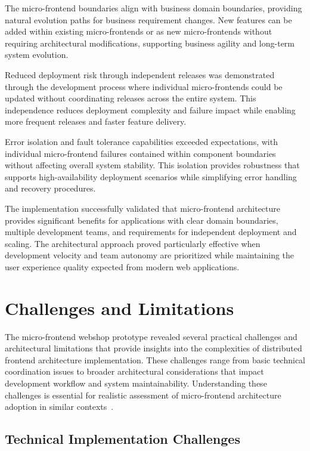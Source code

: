 \documentclass[12pt,a4paper]{report}
\begin{document}
The micro-frontend boundaries align with business domain boundaries, providing natural evolution paths for business requirement changes. New features can be added within existing micro-frontends or as new micro-frontends without requiring architectural modifications, supporting business agility and long-term system evolution.

Reduced deployment risk through independent releases was demonstrated through the development process where individual micro-frontends could be updated without coordinating releases across the entire system. This independence reduces deployment complexity and failure impact while enabling more frequent releases and faster feature delivery.

Error isolation and fault tolerance capabilities exceeded expectations, with individual micro-frontend failures contained within component boundaries without affecting overall system stability. This isolation provides robustness that supports high-availability deployment scenarios while simplifying error handling and recovery procedures.

The implementation successfully validated that micro-frontend architecture provides significant benefits for applications with clear domain boundaries, multiple development teams, and requirements for independent deployment and scaling. The architectural approach proved particularly effective when development velocity and team autonomy are prioritized while maintaining the user experience quality expected from modern web applications.

\section{Challenges and Limitations}

The micro-frontend webshop prototype revealed several practical challenges and architectural limitations that provide insights into the complexities of distributed frontend architecture implementation. These challenges range from basic technical coordination issues to broader architectural considerations that impact development workflow and system maintainability. Understanding these challenges is essential for realistic assessment of micro-frontend architecture adoption in similar contexts~\cite{geers2020micro}.

\subsection{Technical Implementation Challenges}
\end{document}
